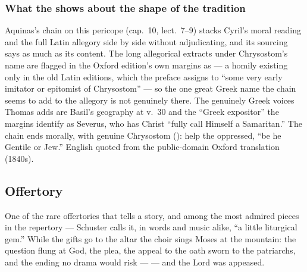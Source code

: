 \subsubsection*{What the  shows about the shape of the tradition}

Aquinas's chain on this pericope (cap.~10, lect.~7--9) stacks Cyril's moral
reading and the full Latin allegory side by side without adjudicating, and
its sourcing says as much as its content. The long allegorical extracts under
Chrysostom's name are flagged in the Oxford edition's own margins as
 --- a homily existing only in the old Latin
editions, which the preface assigns to ``some very early imitator or
epitomist of Chrysostom'' --- so the one great Greek name the chain seems to
add to the allegory is not genuinely there. The genuinely Greek voices Thomas
adds are Basil's geography at v.~30 and the ``Greek expositor'' the margins
identify as Severus, who has Christ ``fully call Himself a Samaritan.'' The
chain ends morally, with genuine Chrysostom ():
help the oppressed, ``be he Gentile or Jew.'' English quoted from the
public-domain Oxford translation (1840s).

\elementguard
\subsection*{Offertory }


One of the rare offertories that tells a story, and among the most admired
pieces in the repertory --- Schuster calls it, in words and music alike, ``a
little liturgical gem.'' While the gifts go to the altar the choir sings
Moses at the mountain: the question flung at God, the plea, the appeal to the
oath sworn to the patriarchs, and the ending no drama would risk ---  --- and the Lord was appeased.

